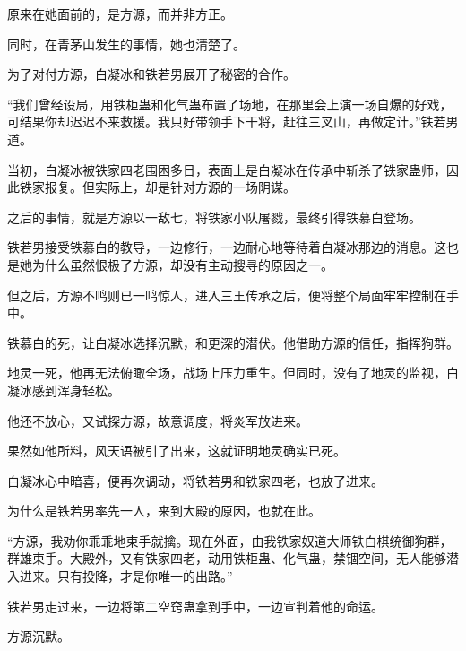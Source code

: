 \begin{this_body}
原来在她面前的，是方源，而并非方正。

同时，在青茅山发生的事情，她也清楚了。

为了对付方源，白凝冰和铁若男展开了秘密的合作。

“我们曾经设局，用铁柜蛊和化气蛊布置了场地，在那里会上演一场自爆的好戏，可结果你却迟迟不来救援。我只好带领手下干将，赶往三叉山，再做定计。”铁若男道。

当初，白凝冰被铁家四老围困多日，表面上是白凝冰在传承中斩杀了铁家蛊师，因此铁家报复。但实际上，却是针对方源的一场阴谋。

之后的事情，就是方源以一敌七，将铁家小队屠戮，最终引得铁慕白登场。

铁若男接受铁慕白的教导，一边修行，一边耐心地等待着白凝冰那边的消息。这也是她为什么虽然恨极了方源，却没有主动搜寻的原因之一。

但之后，方源不鸣则已一鸣惊人，进入三王传承之后，便将整个局面牢牢控制在手中。

铁慕白的死，让白凝冰选择沉默，和更深的潜伏。他借助方源的信任，指挥狗群。

地灵一死，他再无法俯瞰全场，战场上压力重生。但同时，没有了地灵的监视，白凝冰感到浑身轻松。

他还不放心，又试探方源，故意调度，将炎军放进来。

果然如他所料，风天语被引了出来，这就证明地灵确实已死。

白凝冰心中暗喜，便再次调动，将铁若男和铁家四老，也放了进来。

为什么是铁若男率先一人，来到大殿的原因，也就在此。

“方源，我劝你乖乖地束手就擒。现在外面，由我铁家奴道大师铁白棋统御狗群，群雄束手。大殿外，又有铁家四老，动用铁柜蛊、化气蛊，禁锢空间，无人能够潜入进来。只有投降，才是你唯一的出路。”

铁若男走过来，一边将第二空窍蛊拿到手中，一边宣判着他的命运。

方源沉默。

\end{this_body}

